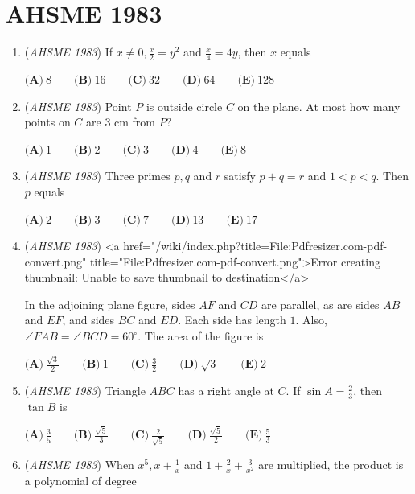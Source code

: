 \section{AHSME 1983}
        \begin{enumerate}
        	\item (\textit{AHSME 1983}) If $x \neq 0, \frac x{2} = y^2$ and $\frac{x}{4} = 4y$, then $x$ equals


 $\textbf{(A)}\ 8\qquad \textbf{(B)}\ 16\qquad \textbf{(C)}\ 32\qquad \textbf{(D)}\ 64\qquad \textbf{(E)}\ 128$


	\item (\textit{AHSME 1983}) Point $P$ is outside circle $C$ on the plane. At most how many points on $C$ are $3$ cm from $P$? 


 $\textbf{(A)} \ 1 \qquad  \textbf{(B)} \ 2 \qquad  \textbf{(C)} \ 3 \qquad  \textbf{(D)} \ 4 \qquad  \textbf{(E)} \ 8$


	\item (\textit{AHSME 1983}) Three primes $p,q$ and $r$ satisfy $p+q = r$ and $1 < p < q$. Then $p$ equals


 $\textbf{(A)}\ 2\qquad \textbf{(B)}\ 3\qquad \textbf{(C)}\ 7\qquad \textbf{(D)}\ 13\qquad \textbf{(E)}\ 17$


	\item (\textit{AHSME 1983}) <a href="/wiki/index.php?title=File:Pdfresizer.com-pdf-convert.png" title="File:Pdfresizer.com-pdf-convert.png">Error creating thumbnail: Unable to save thumbnail to destination</a>


 In the adjoining plane figure, sides $AF$ and $CD$ are parallel, as are sides $AB$ and $EF$, 
and sides $BC$ and $ED$. Each side has length $1$. Also, $\angle FAB = \angle BCD = 60^\circ$. 
The area of the figure is 


 $\textbf{(A)} \ \frac{\sqrt 3}{2} \qquad  \textbf{(B)} \ 1 \qquad  \textbf{(C)} \ \frac{3}{2} \qquad  \textbf{(D)}\ \sqrt{3}\qquad \textbf{(E)}\ 2$


	\item (\textit{AHSME 1983}) Triangle $ABC$ has a right angle at $C$. If $\sin A = \frac{2}{3}$, then $\tan B$ is


 $\textbf{(A)}\ \frac{3}{5}\qquad \textbf{(B)}\ \frac{\sqrt 5}{3}\qquad \textbf{(C)}\ \frac{2}{\sqrt 5}\qquad \textbf{(D)}\ \frac{\sqrt{5}}{2}\qquad \textbf{(E)}\ \frac{5}{3}$


	\item (\textit{AHSME 1983}) When $x^5, x+\frac{1}{x}$ and $1+\frac{2}{x} + \frac{3}{x^2}$ are multiplied, the product is a polynomial of degree



\end{enumerate}
